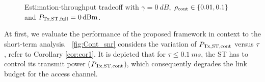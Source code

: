\begin{figure}

\centering
{}
\caption{Estimation-throughput tradeoff with $\gamma = \SI{0}{dB}$, $\rho_{\text{cont}} \in \{0.01, 0.1\}$ and $P_{\text{Tx,ST,full}} = \SI{0}{dBm}$.}
\label{fig:ETT}
\end{figure}
At first, we evaluate the performance of the proposed framework in context to the short-term analysis. \figurename~\ref{fig:Cont_snr} considers the variation of $P_{\text{Tx,ST,cont}}$ versus $\tau$, refer to Corollary \ref{cor:cor1}. It is depicted that for $\tau \le \SI{0.1}{ms}$, the ST has to control its transmit power ($P_{\text{Tx,ST,cont}}$), which consequently degrades the link budget for the access channel. 
